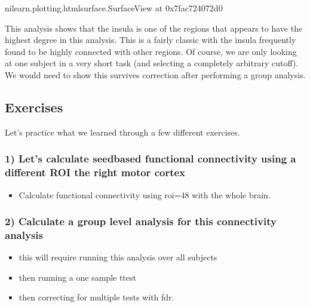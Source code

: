 \documentclass[letterpaper,10pt,english]{sphinxmanual}
\begin{document}
\begin{sphinxVerbatim}[commandchars=\\\{\}]
\PYGZlt{}nilearn.plotting.html\PYGZus{}surface.SurfaceView at 0x7fac724072d0\PYGZgt{}
\end{sphinxVerbatim}

This analysis shows that the insula is one of the regions that appears to have the highest degree in this analysis. This is a fairly classic  with the insula frequently found to be highly connected with other regions. Of course, we are only looking at one subject in a very short task (and selecting a completely arbitrary cutoff). We would need to show this survives correction after performing a group analysis.


\subsection{Exercises}
\label{\detokenize{content/Connectivity:exercises}}
Let’s practice what we learned through a few different exercises.


\subsubsection{1) Let’s calculate seed\sphinxhyphen{}based functional connectivity using a different ROI \sphinxhyphen{} the right motor cortex}
\label{\detokenize{content/Connectivity:let-s-calculate-seed-based-functional-connectivity-using-a-different-roi-the-right-motor-cortex}}\begin{itemize}
\item {} 
Calculate functional connectivity using roi=48 with the whole brain.

\end{itemize}


\subsubsection{2) Calculate a group level analysis for this connectivity analysis}
\label{\detokenize{content/Connectivity:calculate-a-group-level-analysis-for-this-connectivity-analysis}}\begin{itemize}
\item {} 
this will require running this analysis over all subjects

\item {} 
then running a one sample t\sphinxhyphen{}test

\item {} 
then correcting for multiple tests with fdr.

\end{itemize}
\end{document}
